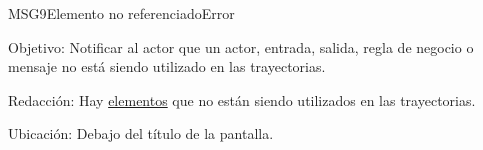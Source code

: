 \begin{mensaje}{MSG9}{Elemento no referenciado}{Error}
	\item [Objetivo:] Notificar al actor que un actor, entrada, salida, regla de negocio o mensaje no está siendo utilizado en las trayectorias.
	\item[Redacción:] Hay \hyperlink{tElemento}{elementos} que no están siendo utilizados en las trayectorias.
	\item [Ubicación:] Debajo del título de la pantalla.
\end{mensaje}